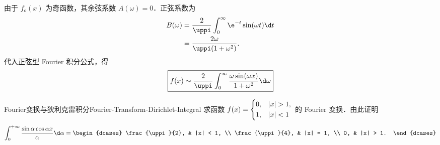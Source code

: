 \begin{solution}
    由于 $f_o(x)$ 为奇函数，其余弦系数 $A(\omega) = 0$．正弦系数为
    \begin{equation}
        \begin{aligned}
            B(\omega) & = \frac{2}{\uppi} \int_{0}^{\infty} \e^{-t} \sin(\omega t) \d t \\
                      & = \frac{2\omega}{\uppi (1+\omega^2)}.
        \end{aligned}
    \end{equation}
    代入正弦型 Fourier 积分公式，得
    \begin{equation}
        \boxed{f(x) \sim \frac{2}{\uppi} \int_0^\infty \frac{\omega \sin(\omega x)}{1+\omega^2} \d\omega}
    \end{equation}
\end{solution}

\begin{problem}{Fourier变换与狄利克雷积分}{Fourier-Transform-Dirichlet-Integral}
    求函数 $f(x) = \begin{dcases} 0, & |x| > 1, \\ 1, & |x| < 1 \end{dcases}$ 的 Fourier 变换．由此证明
    \begin{equation}
        \int_{0}^{+\infty} \frac{\sin \alpha \cos \alpha x}{\alpha} \d\alpha = \begin{dcases} \frac{\uppi}{2}, & |x| < 1, \\ \frac{\uppi}{4}, & |x| = 1, \\ 0, & |x| > 1. \end{dcases}
    \end{equation}
\end{problem}


